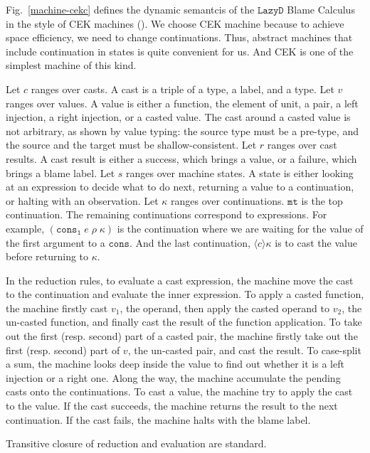 \documentclass[acmsmall,review,anonymous]{acmart}\settopmatter{printfolios=true,printccs=false,printacmref=false}
\newcommand{\lazyD}{$\mathtt{Lazy D}$}
\begin{document}
Fig.~\ref{machine-cekc} defines the dynamic semantcis of the \lazyD{} Blame 
Calculus in the style of CEK machines (\citet{felleisen1986control}). 
We choose CEK machine because to achieve space efficiency, we need to change 
continuations. Thus, abstract machines that include continuation in states is 
quite convenient for us. And CEK is one of the simplest machine of this kind.

Let $ c $ ranges over casts. A cast is a triple of a type, a label, and a type.
Let $ v $ ranges over values. A value is either a function, the 
element of unit, a pair, a left injection, a right injection, or a casted value.
The cast around a casted value is not arbitrary, as shown by value typing: the 
source type must be a pre-type, and the source and the target must be 
shallow-consistent.
Let $ r $ ranges over cast results. A cast result is either a success, which 
brings a value, or a failure, which brings a blame label.
Let $ s $ ranges over machine states. A state is either looking at an 
expression to decide what to do next, returning a value to a continuation, or 
halting with an observation.
Let $ \kappa $ ranges over continuations. $ \mathtt{mt} $ is the top 
continuation. The remaining continuations correspond to expressions. For 
example, $ (\mathtt{cons_1} \; e \; \rho \; \kappa) $ is the continuation where 
we are waiting for the value of the first argument to a $ \mathtt{cons} $. And 
the last continuation, $ \langle c \rangle \kappa $ is to cast the value before 
returning to $ \kappa $.

In the reduction rules, to evaluate a cast expression, the machine move the 
cast to the continuation and evaluate the inner expression. To apply a casted 
function, the machine firstly cast $ v_1 $, the operand, then apply the casted 
operand to $ v_2 $, the un-casted function, and finally cast the result of the 
function application. To take out the first (resp. second) part of a casted 
pair, the machine firstly take out the first (resp. second) part of $ v $, the 
un-casted pair, and cast the result. To case-split a sum, the machine looks 
deep inside the value to find out whether it is a left injection or a right 
one. Along the way, the machine accumulate the pending casts onto the 
continuations. To cast a value, the machine try to apply the cast to the value. 
If the cast succeeds, the machine returns the result to the next continuation. 
If the cast fails, the machine halts with the blame label.

Transitive closure of reduction and evaluation are standard.
\end{document}
